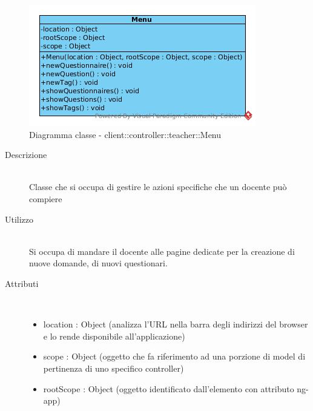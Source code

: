 \vspace{0.5cm}
\hypertarget{client::controller::teacher::Menu}{}
\begin{center}
			\begin{figure}[H]
				\centering \includegraphics[scale=4, max width=\textwidth, max height=\myheight]{../img/diagrammiClassi/client/controller/teacher/Menu.png}
				\caption{Diagramma classe - client::controller::teacher::Menu}
			\end{figure}
		\end{center}\begin{description}
\item[Descrizione] \hfill \\
 Classe che si occupa di gestire le azioni specifiche che un docente può compiere
\item[Utilizzo] \hfill \\
 Si occupa di mandare il docente alle pagine dedicate per la creazione di nuove domande, di nuovi questionari.
\item[Attributi] \hfill \\
 \vspace{-7mm}
\begin{itemize}
\item location : Object (analizza l'URL nella barra degli indirizzi del browser e lo rende disponibile all'applicazione)
\item scope : Object (oggetto che fa riferimento ad una porzione di model di pertinenza di uno specifico controller)
\item rootScope : Object (oggetto identificato dall’elemento con attributo ng-app)
\end{itemize}


\end{description}

